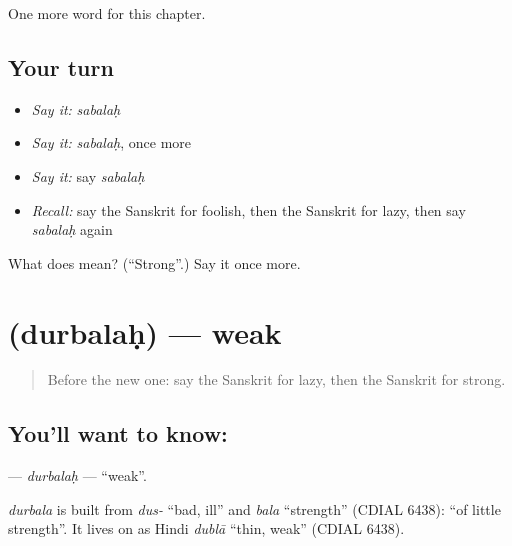 \begin{grammarlens}[title={What you've built}]
One more word for this chapter.
\end{grammarlens}

\subsection*{Your turn}
\begin{itemize}
\raggedright
  \item \emph{Say it:} \emph{sabalaḥ}
  \item \emph{Say it:} \emph{sabalaḥ}, once more
  \item \emph{Say it:} say \emph{sabalaḥ}
  \item \emph{Recall:} say the Sanskrit for foolish, then the Sanskrit for lazy, then say \emph{sabalaḥ} again
\end{itemize}

\begin{tcolorbox}[breakable,colback=teal!4,colframe=teal!35!black,title={Before you move on}]
What does  mean? (\textquotedblleft{}Strong\textquotedblright{}.) Say it once more.
\end{tcolorbox}
\section[\texorpdfstring{\sk{दुर्बलः} (durbalaḥ)}{दुर्बलः (durbalaḥ)}]{ (durbalaḥ) — weak}

\label{lesson:SA-C130-durbalah}



\begin{quote}
Before the new one: say the Sanskrit for lazy, then the Sanskrit for strong.
\end{quote}

\subsection*{You'll want to know: }
\textbf{} — \emph{durbalaḥ} — \textquotedblleft{}weak\textquotedblright{}.

\begin{cousinweb}
\emph{durbala} is built from \emph{dus-} \textquotedblleft{}bad, ill\textquotedblright{} and \emph{bala} \textquotedblleft{}strength\textquotedblright{} (CDIAL 6438): \textquotedblleft{}of little strength\textquotedblright{}. It lives on as Hindi \emph{dublā} \textquotedblleft{}thin, weak\textquotedblright{} (CDIAL 6438).
\end{cousinweb}


